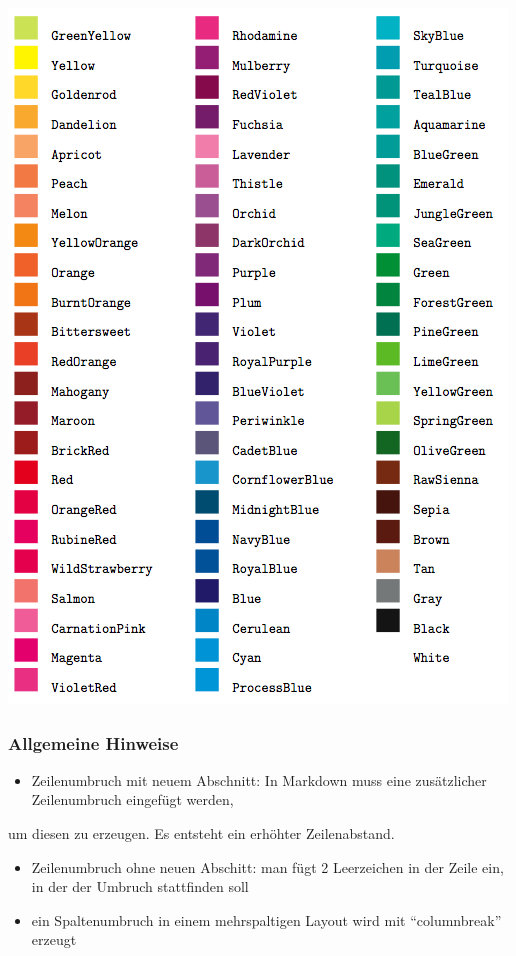 \documentclass[
  a4paper,
  twoside]{article}
\providecommand{\tightlist}{%
  \setlength{\itemsep}{0pt}\setlength{\parskip}{0pt}}
\begin{document}
\includegraphics{latexcolor.png}

\hypertarget{allgemeine-hinweise}{%
\subsubsection{Allgemeine Hinweise}\label{allgemeine-hinweise}}

\begin{itemize}
\tightlist
\item
  Zeilenumbruch mit neuem Abschnitt: In Markdown muss eine zusätzlicher Zeilenumbruch eingefügt werden,
\end{itemize}

um diesen zu erzeugen. Es entsteht ein erhöhter Zeilenabstand.

\begin{itemize}
\item
  Zeilenumbruch ohne neuen Abschitt: man fügt 2 Leerzeichen in der Zeile ein,\\
  in der der Umbruch stattfinden soll
\item
  ein Spaltenumbruch in einem mehrspaltigen Layout wird mit ``columnbreak'' erzeugt
\end{itemize}
\end{document}
